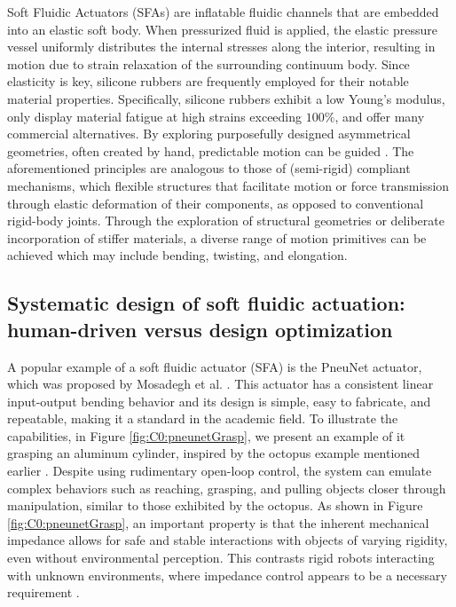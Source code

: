 Soft Fluidic Actuators (SFAs) are inflatable fluidic channels that are embedded into an elastic soft body. When pressurized fluid is applied, the elastic pressure vessel uniformly distributes the internal stresses along the interior, resulting in motion due to strain relaxation of the surrounding continuum body. Since elasticity is key, silicone rubbers are frequently employed for their notable material properties. Specifically, silicone rubbers exhibit a low Young's modulus, only display material fatigue at high strains exceeding $100\%$, and offer many commercial alternatives. By exploring purposefully designed asymmetrical geometries, often created by hand, predictable motion can be guided \cite{Xavier2022Jun,Rus2015,Hughes2016Nov}. The aforementioned principles are analogous to those of (semi-rigid) compliant mechanisms, which flexible structures that facilitate motion or force transmission through elastic deformation of their components, as opposed to conventional rigid-body joints. Through the exploration of structural geometries or deliberate incorporation of stiffer materials, a diverse range of motion primitives can be achieved which may include bending, twisting, and elongation.

\subsection[Human-driven design versus design optimization]{Systematic design of soft fluidic actuation: human-driven versus design optimization}
A popular example of a soft fluidic actuator (SFA) is the PneuNet actuator, which was proposed by Mosadegh et al. \cite{Mosadegh2014}. This actuator has a consistent linear input-output bending behavior and its design is simple, easy to fabricate, and repeatable, making it a standard in the academic field. To illustrate the capabilities, in Figure \ref{fig:C0:pneunetGrasp}, we present an example of it grasping an aluminum cylinder, inspired by the octopus example mentioned earlier \cite{Sumbre2001Sep}. Despite using rudimentary open-loop control, the system can emulate complex behaviors such as reaching, grasping, and pulling objects closer through manipulation, similar to those exhibited by the octopus. As shown in Figure \ref{fig:C0:pneunetGrasp}, an important property is that the inherent mechanical impedance allows for safe and stable interactions with objects of varying rigidity, even without environmental perception. This contrasts rigid robots interacting with unknown environments, where impedance control appears to be a necessary requirement \cite{Murray1994,DeLuca2016Jul}.

